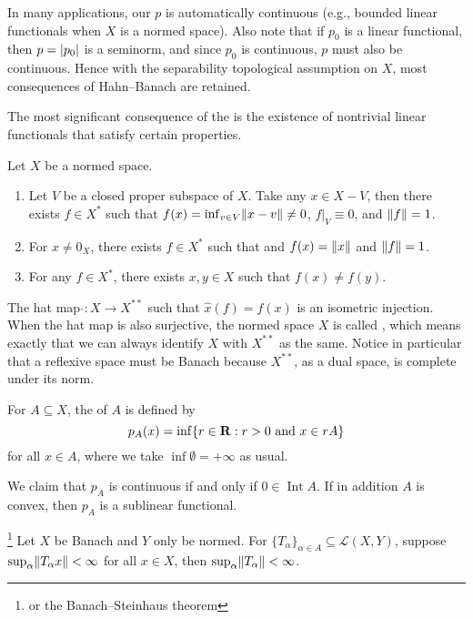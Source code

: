     In many applications, our $p$ is automatically continuous (e.g., bounded linear functionals when $X$ is a normed space). Also note that if $p_0$ is a linear functional, then $p = \lvert p_0 \rvert$ is a seminorm, and since $p_0$ is continuous, $p$ must also be continuous. Hence with the separability topological assumption on $X$, most consequences of Hahn--Banach are retained.

    The most significant consequence of the  is the existence of nontrivial linear functionals that satisfy certain properties.
\begin{cor} Let $X$ be a normed space.
    \begin{enumerate}
        \item Let $V$ be a closed proper subspace of $X$. Take any $x \in X - V$, then there exists $f \in X^*$ such that $f(x) = \inf_{v \in V}\lVert x - v \rVert \neq 0$, $f|_V \equiv 0$, and $\lVert f \rVert = 1$.
        \item For $x \neq 0_X$, there exists $f \in X^*$ such that and $f(x) = \lVert x \rVert$ and $\lVert f \rVert = 1$.
        \item For any $f \in X^*$, there exists $x,y \in X$ such that $f(x) \neq f(y)$.
    \end{enumerate}
\end{cor}

The hat map $\hat{}:X \to X^{**}$ such that $\hat x(f) = f(x)$ is an isometric injection. When the hat map is also surjective, the normed space $X$ is called , which means exactly that we can always identify $X$ with $X^{**}$ as the same. Notice in particular that a reflexive space must be Banach because $X^{**}$, as a dual space, is complete under its norm.

For $A \subseteq X$, the  of $A$ is defined by \[
    p_A(x) = \inf\{r \in \mathbf{R} : r > 0 \text{ and } x \in rA\}
\] for all $x \in A$, where we take $\inf \emptyset = + \infty$ as usual.

We claim that $p_A$ is continuous if and only if $0 \in \operatorname{Int} A$. If in addition $A$ is convex, then $p_A$ is a sublinear functional.


\begin{namedthm} \footnote{or the Banach--Steinhaus theorem} \label{thm:unif-bdd-principle}
    Let $X$ be Banach and $Y$ only be normed. For $\{T_\alpha\}_{\alpha \in A} \subseteq \mathcal L(X,Y)$, suppose $\sup_\alpha \lVert T_\alpha x \rVert < \infty$ for all $x \in X$, then $\sup_\alpha\lVert T_\alpha \rVert < \infty$.
\end{namedthm}

